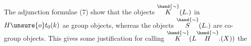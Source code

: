 The adjunction formulae (7) show that the objects $\overset{\hand{\sim}}{K}(L.)$
in $H\unsure{o}t_{0}(k)$ ae group objects, whereas the objects $\overset{\hand{\sim}}{S}(L.)$ are co-group
objects. This gives some  justification for calling  $\overset{\hand{\sim}}{K}(L\overset{\hand{\sim}}{H}.(X))$ the
